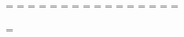     \newtoks\jobdir                  \jobdir={}
    \newtoks\tempnametoks            \tempnametoks={}
    \newtoks\oldheadline             \oldheadline={}
    \newtoks\oldfootline             \oldfootline={}
    \newtoks\subsectstyle            \subsectstyle={\Number}
    \newtoks\subsubsectstyle         \subsubsectstyle={\Number}
    \newtoks\runningheadlines        \runningheadlines={\relax}
    \newtoks\chapterformat           \chapterformat={\titlestyle}
    \newtoks\sectionformat           \sectionformat={\relax}
    \newtoks\subsectionformat        \subsectionformat={\relax}
    \newtoks\subsubsectionformat     \subsubsectionformat={\relax}
    \newtoks\chapterfontstyle        \chapterfontstyle={\rm}
    \newtoks\sectionfontstyle        \sectionfontstyle={\rm}
    \newtoks\subsectionfontstyle     \subsectionfontstyle={\rm}
    \newtoks\sectionfontstyleb       \sectionfontstyleb={\caps}
    \newtoks\subsubsectionfontstyle  \subsubsectionfontstyle={\rm}

    \newcount\subsectnumber           {}
    \newcount\subsubsectnumber        {}


   \newdimen\pictureindent           \pictureindent=15pt
   \newdimen\str
   \newdimen\squareht
   \newdimen\squarewd
   \newskip\doublecolskip
   \newskip\tableoftablesskip        \tableoftablesskip=\baselineskip


   \newbox\squarebox


   \newskip\sectionindent            \sectionindent=0pt
   \newskip\subsectionindent         \subsectionindent=0pt
  \def\thechapterhead{\relax}
  \def\thesectionhead{\relax}
  \def\thesubsecthead{\relax}
  \def\thesubsubsecthead{\relax}

